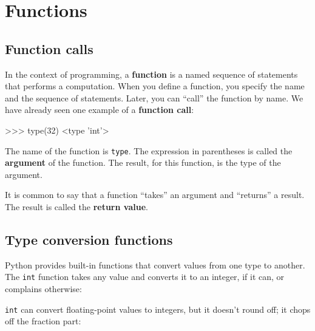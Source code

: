 \chapter{Functions}
\label{funcchap}

\section{Function calls}
\label{functionchap}

In the context of programming, a {\bf function} is a named sequence of
statements that performs a computation.  When you define a function,
you specify the name and the sequence of statements.  Later, you can
``call'' the function by name.  
We have already seen one example of a {\bf function call}:

\beforeverb
\begin{pyinterpreter}
>>> type(32)
<type 'int'>
\end{pyinterpreter}
\afterverb
%
The name of the function is {\tt type}.  The expression in parentheses
is called the {\bf argument} of the function.  The result, for this
function, is the type of the argument.


It is common to say that a function ``takes'' an argument and ``returns''
a result.  The result is called the {\bf return value}.



\section{Type conversion functions}



Python provides built-in functions that convert values
from one type to another.  The {\tt int} function takes any value and
converts it to an integer, if it can, or complains otherwise:


\beforeverb
{}
\afterverb
%
{\tt int} can convert floating-point values to integers, but it
doesn't round off; it chops off the fraction part:

